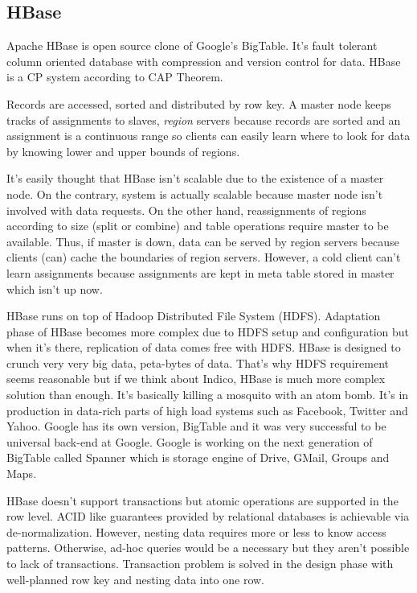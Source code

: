 \subsection{HBase}

Apache HBase is open source clone of Google's BigTable. It's fault tolerant column oriented database with compression and version control for data. HBase is a CP system according to CAP Theorem.

Records are accessed, sorted and distributed by row key. A master node keeps tracks of assignments to slaves, \textit{region} servers because records are sorted and an assignment is a continuous range so clients can easily learn where to look for data by knowing lower and upper bounds of regions.

It's easily thought that HBase isn't scalable due to the existence of a master node. On the contrary, system is actually scalable because master node isn't involved with data requests. On the other hand, reassignments of regions according to size (split or combine) and table operations require master to be available. Thus, if master is down, data can be served by region servers because clients (can) cache the boundaries of region servers. However, a cold client can't learn assignments because assignments are kept in meta table stored in master which isn't up now.

HBase runs on top of Hadoop Distributed File System (HDFS). Adaptation phase of HBase becomes more complex due to HDFS setup and configuration but when it's there, replication of data comes free with HDFS. HBase is designed to crunch very very big data, peta-bytes of data. That's why HDFS requirement seems reasonable but  if we think about Indico, HBase is much more complex solution than enough. It's basically killing a mosquito with an atom bomb. It's in production in data-rich parts of high load systems such as Facebook, Twitter and Yahoo. 
Google has its own version, BigTable and it was very successful to be universal back-end at Google. Google is working on the next generation of BigTable called Spanner which is storage engine of Drive, GMail, Groups and Maps.

HBase doesn't support transactions but atomic operations are supported in the row level. ACID like guarantees provided by relational databases is achievable via de-normalization. However, nesting data requires more or less to know access patterns. Otherwise, ad-hoc queries would be a necessary but they aren't possible to lack of transactions. Transaction problem is solved in the design phase with well-planned row key and nesting data into one row.


